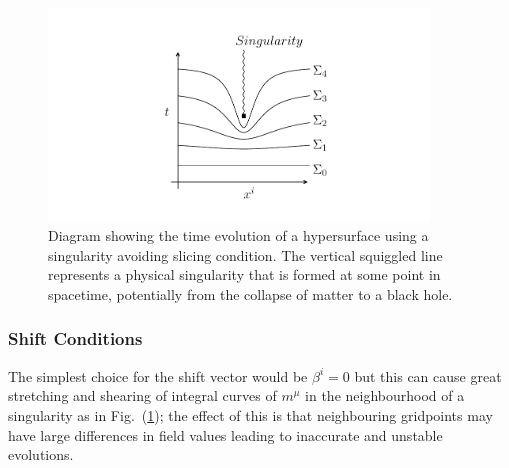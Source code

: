 \begin{figure}[h!]
    \includegraphics[width=0.9\textwidth]{png/slicing.pdf} 
      \caption{Diagram showing the time evolution of a hypersurface using a singularity avoiding slicing condition. The vertical squiggled line represents a physical singularity that is formed at some point in spacetime, potentially from the collapse of matter to a black hole.} \label{nr:fig:singularity_avoiding}
\end{figure}


\subsubsection{Shift Conditions}

The simplest choice for the shift vector would be $\beta^i=0$ but this can cause great stretching and shearing of integral curves of $m^\mu$ in the neighbourhood of a singularity as in Fig.~(\ref{nr:fig:singularity_avoiding}); the effect of this is that neighbouring gridpoints may have large differences in field values leading to inaccurate and unstable evolutions.

